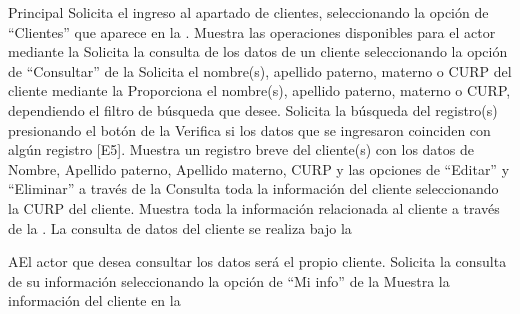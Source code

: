 	\begin{UCtrayectoria}{Principal}
		\UCpaso[\UCactor] Solicita el ingreso al apartado de clientes, seleccionando la opción de ``Clientes'' que aparece en la  .
		\UCpaso Muestra las operaciones disponibles para el actor mediante la 
		\UCpaso[\UCactor] Solicita la consulta de los datos de un cliente seleccionando la opción de ``Consultar'' de la 
		\UCpaso Solicita el nombre(s), apellido paterno, materno o CURP del cliente mediante la 
		\UCpaso[\UCactor] Proporciona el nombre(s), apellido paterno, materno o CURP, dependiendo el filtro de búsqueda que desee.
		\UCpaso[\UCactor] Solicita la búsqueda del registro(s) presionando el botón  de la 
		\UCpaso Verifica si los datos que se ingresaron coinciden con algún registro [E5].
		\UCpaso Muestra un registro breve del cliente(s) con los datos de Nombre, Apellido paterno, Apellido materno, CURP y las opciones de ``Editar'' y ``Eliminar'' a través de la 
		\UCpaso[\UCactor] Consulta toda la información del cliente seleccionando la CURP del cliente.
		\UCpaso Muestra toda la información relacionada al cliente a través de la . La consulta de datos del cliente se realiza bajo la  
	\end{UCtrayectoria}
	
	\begin{UCtrayectoriaA}{A}{El actor que desea consultar los datos será el propio cliente.}
			\UCpaso[\UCactor] Solicita la consulta de su información seleccionando la opción de ``Mi info'' de la 
			\UCpaso Muestra la información del cliente en la 
		\end{UCtrayectoriaA}
	

		

	